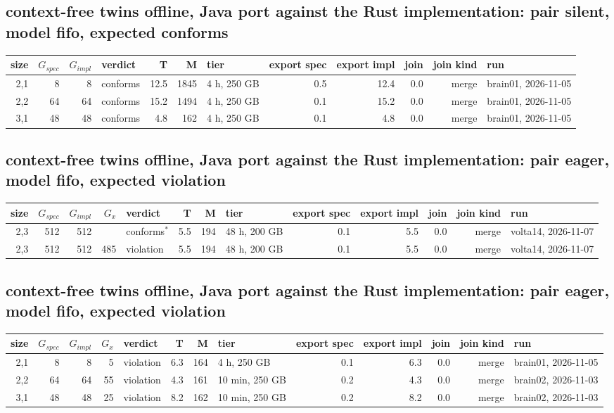 \documentclass[10pt]{article}
\begin{document}
\subsection*{context-free twins offline, Java port against the Rust implementation: pair \textsf{silent}, model fifo, expected conforms}
\begin{longtable}{@{}rrrlrrlrrrrl@{}}
\toprule
size & $G_{\mathit{spec}}$ & $G_{\mathit{impl}}$ & verdict & T & M & tier & export spec & export impl & join & join kind & run \\
\midrule
\endhead
\color{blue} 2,1 & 8 & 8 & conforms & 12.5 & 1845 & 4 h, 250 GB & 0.5 & 12.4 & 0.0 & merge & brain01, 2026-11-05 \\
\color{blue} 2,2 & 64 & 64 & conforms & 15.2 & 1494 & 4 h, 250 GB & 0.1 & 15.2 & 0.0 & merge & brain01, 2026-11-05 \\
\color{blue} 3,1 & 48 & 48 & conforms & 4.8 & 162 & 4 h, 250 GB & 0.1 & 4.8 & 0.0 & merge & brain01, 2026-11-05 \\
\bottomrule
\end{longtable}
\subsection*{context-free twins offline, Java port against the Rust implementation: pair \textsf{eager}, model fifo, expected violation}
\begin{longtable}{@{}rrrrlrrlrrrrl@{}}
\toprule
size & $G_{\mathit{spec}}$ & $G_{\mathit{impl}}$ & $G_x$ & verdict & T & M & tier & export spec & export impl & join & join kind & run \\
\midrule
\endhead
\color{red} 2,3 & 512 & 512 &  & conforms$^{\ast}$ & 5.5 & 194 & 48 h, 200 GB & 0.1 & 5.5 & 0.0 & merge & volta14, 2026-11-07 \\
\color{red} 2,3 & 512 & 512 & 485 & violation & 5.5 & 194 & 48 h, 200 GB & 0.1 & 5.5 & 0.0 & merge & volta14, 2026-11-07 \\
\bottomrule
\end{longtable}
\subsection*{context-free twins offline, Java port against the Rust implementation: pair \textsf{eager}, model fifo, expected violation}
\begin{longtable}{@{}rrrrlrrlrrrrl@{}}
\toprule
size & $G_{\mathit{spec}}$ & $G_{\mathit{impl}}$ & $G_x$ & verdict & T & M & tier & export spec & export impl & join & join kind & run \\
\midrule
\endhead
\color{blue} 2,1 & 8 & 8 & 5 & violation & 6.3 & 164 & 4 h, 250 GB & 0.1 & 6.3 & 0.0 & merge & brain01, 2026-11-05 \\
\color{blue} 2,2 & 64 & 64 & 55 & violation & 4.3 & 161 & 10 min, 250 GB & 0.2 & 4.3 & 0.0 & merge & brain02, 2026-11-03 \\
\color{blue} 3,1 & 48 & 48 & 25 & violation & 8.2 & 162 & 10 min, 250 GB & 0.2 & 8.2 & 0.0 & merge & brain02, 2026-11-03 \\
\bottomrule
\end{longtable}
\end{document}

